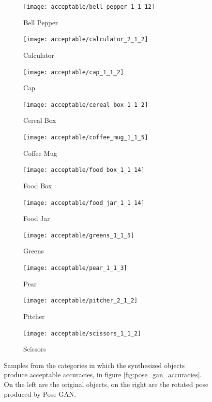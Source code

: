 \begin{figure}[h!]
	\centering
	\begin{subfigure}{0.32\textwidth}
		\texttt{[image: acceptable/bell\_pepper\_1\_1\_12]}
		\caption{Bell Pepper}
	\end{subfigure}
	\begin{subfigure}{0.32\textwidth}
		\texttt{[image: acceptable/calculator\_2\_1\_2]}
		\caption{Calculator}
	\end{subfigure} 
	\begin{subfigure}{0.32\textwidth}
		\texttt{[image: acceptable/cap\_1\_1\_2]}
		\caption{Cap}
	\end{subfigure} 
	\begin{subfigure}{0.32\textwidth}
		\texttt{[image: acceptable/cereal\_box\_1\_1\_2]}
		\caption{Cereal Box}
	\end{subfigure} 
	\begin{subfigure}{0.32\textwidth}
		\texttt{[image: acceptable/coffee\_mug\_1\_1\_5]}
		\caption{Coffee Mug}
	\end{subfigure} 
	\begin{subfigure}{0.32\textwidth}
		\texttt{[image: acceptable/food\_box\_1\_1\_14]}
		\caption{Food Box}
	\end{subfigure} 
	\begin{subfigure}{0.32\textwidth}
		\texttt{[image: acceptable/food\_jar\_1\_1\_14]}
		\caption{Food Jar}
	\end{subfigure} 
	\begin{subfigure}{0.32\textwidth}
		\texttt{[image: acceptable/greens\_1\_1\_5]}
		\caption{Greens}
	\end{subfigure} 
	\begin{subfigure}{0.32\textwidth}
		\texttt{[image: acceptable/pear\_1\_1\_3]}
		\caption{Pear}
	\end{subfigure} 
	\begin{subfigure}{0.32\textwidth}
		\texttt{[image: acceptable/pitcher\_2\_1\_2]}
		\caption{Pitcher}
	\end{subfigure} 
	\begin{subfigure}{0.32\textwidth}
		\texttt{[image: acceptable/scissors\_1\_1\_2]}
		\caption{Scissors}
	\end{subfigure} 
	
	\caption{Samples from the categories in which the synthesized objects produce
		acceptable accuracies, in figure \ref{fig:pose_gan_accuracies}. On the left are
	the original objects, on the right are the rotated pose produced by Pose-GAN.}
	\label{fig:acceptable}
\end{figure}

